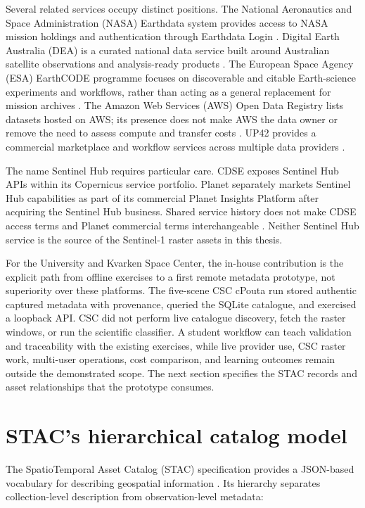 Several related services occupy distinct positions. The National Aeronautics and Space
Administration (NASA) Earthdata system provides access to NASA mission holdings and
authentication through Earthdata Login \citep{nasa-earthdata}. Digital Earth Australia (DEA)
is a curated national data service built around Australian satellite observations and
analysis-ready products \citep{dea-home,odc-home}. The European Space Agency (ESA)
EarthCODE programme focuses on discoverable and citable Earth-science experiments and
workflows, rather than acting as a general replacement for mission archives
\citep{esa-earthcode}. The Amazon Web Services (AWS) Open Data Registry lists datasets
hosted on AWS; its presence does not make AWS the data owner or remove the need to assess
compute and transfer costs \citep{aws-registry}. UP42 provides a commercial marketplace and
workflow services across multiple data providers \citep{up42-home}.

The name Sentinel Hub requires particular care. CDSE exposes Sentinel Hub APIs within its
Copernicus service portfolio. Planet separately markets Sentinel Hub capabilities as part of
its commercial Planet Insights Platform after acquiring the Sentinel Hub business. Shared
service history does not make CDSE access terms and Planet commercial terms interchangeable
\citep{cdse-sentinelhub,planet-insights}. Neither Sentinel Hub service is the source of the
Sentinel-1 raster assets in this thesis.

For the University and Kvarken Space Center, the in-house contribution is the explicit path
from offline exercises to a first remote metadata prototype, not superiority over these
platforms. The five-scene CSC cPouta run stored authentic captured metadata with provenance,
queried the SQLite catalogue, and exercised a loopback API. CSC did not perform live catalogue
discovery, fetch the raster windows, or run the scientific classifier. A student workflow can
teach validation and traceability with the existing exercises, while live provider use,
CSC raster work, multi-user operations, cost comparison, and learning outcomes remain outside
the demonstrated scope. The next section specifies the STAC records and asset relationships
that the prototype consumes.

\section{STAC's hierarchical catalog model}

The SpatioTemporal Asset Catalog (STAC) specification provides a JSON-based vocabulary for
describing geospatial information \cite{stac-spec}. Its hierarchy separates collection-level
description from observation-level metadata:

